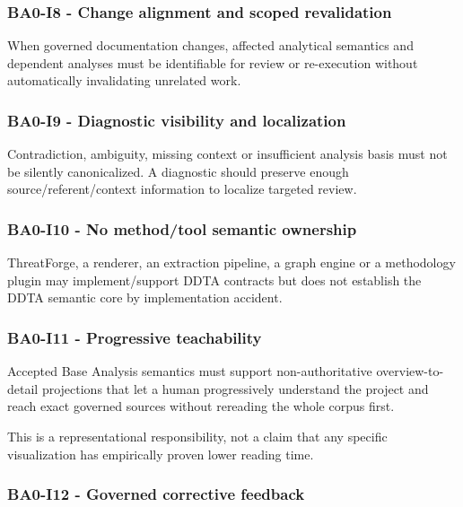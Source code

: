 \documentclass[
  10pt,
  a4paper,
]{article}
\begin{document}
\subsubsection{BA0-I8 - Change alignment and scoped
revalidation}\label{ba0-i8---change-alignment-and-scoped-revalidation}

When governed documentation changes, affected analytical semantics and
dependent analyses must be identifiable for review or re-execution
without automatically invalidating unrelated work.

\subsubsection{BA0-I9 - Diagnostic visibility and
localization}\label{ba0-i9---diagnostic-visibility-and-localization}

Contradiction, ambiguity, missing context or insufficient analysis basis
must not be silently canonicalized. A diagnostic should preserve enough
source/referent/context information to localize targeted review.

\subsubsection{BA0-I10 - No method/tool semantic
ownership}\label{ba0-i10---no-methodtool-semantic-ownership}

ThreatForge, a renderer, an extraction pipeline, a graph engine or a
methodology plugin may implement/support DDTA contracts but does not
establish the DDTA semantic core by implementation accident.

\subsubsection{BA0-I11 - Progressive
teachability}\label{ba0-i11---progressive-teachability}

Accepted Base Analysis semantics must support non-authoritative
overview-to-detail projections that let a human progressively understand
the project and reach exact governed sources without rereading the whole
corpus first.

This is a representational responsibility, not a claim that any specific
visualization has empirically proven lower reading time.

\subsubsection{BA0-I12 - Governed corrective
feedback}\label{ba0-i12---governed-corrective-feedback}
\end{document}
